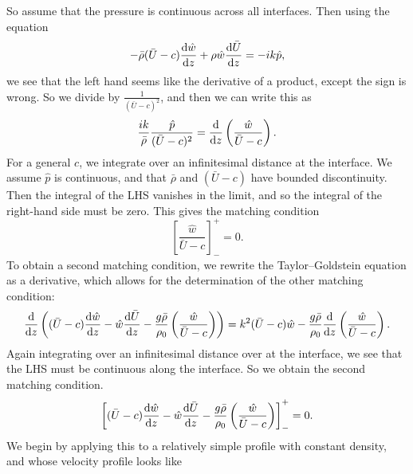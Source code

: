 \documentclass[a4paper]{article}
\begin{document}
So assume that the pressure is continuous across all interfaces. Then using the equation
\[
  - \bar{\rho} (\bar{U} - c) \frac{\mathrm{d} \hat{w}}{\mathrm{d} z} + \rho \hat{w} \frac{\mathrm{d} \bar{U}}{\mathrm{d} z} = -ik\hat{p},
\]
we see that the left hand seems like the derivative of a product, except the sign is wrong. So we divide by $\frac{1}{(\bar{U} - c)^2}$, and then we can write this as
\[
  \frac{ik}{\bar{\rho}} \frac{\hat{p}}{(\bar{U} - c)^2} = \frac{\mathrm{d}}{\mathrm{d} z}\left(\frac{\hat{w}}{\bar{U} - c}\right).
\]
For a general $c$, we integrate over an infinitesimal distance at the interface. We assume $\hat{p}$ is continuous, and that $\bar{\rho}$ and $(\bar{U} - c)$ have bounded discontinuity. Then the integral of the LHS vanishes in the limit, and so the integral of the right-hand side must be zero. This gives the matching condition
\[
  \left[ \frac{\hat{w}}{ \bar{U} - c}\right]^+_- = 0.
\]
To obtain a second matching condition, we rewrite the Taylor--Goldstein equation as a derivative, which allows for the determination of the other matching condition:
\[
  \frac{\mathrm{d}}{\mathrm{d} z} \left((\bar{U} - c) \frac{\mathrm{d} \hat{w}}{\mathrm{d} z} - \hat{w} \frac{\mathrm{d} \bar{U}}{\mathrm{d} z} - \frac{g \bar{\rho}}{\rho_0}\left(\frac{\hat{w}}{\bar{U} - c}\right)\right) = k^2 (\bar{U} - c)\hat{w} - \frac{g \bar{\rho}}{\rho_0} \frac{\mathrm{d}}{\mathrm{d} z} \left(\frac{\hat{w}}{\bar{U} - c}\right).
\]
Again integrating over an infinitesimal distance over at the interface, we see that the LHS must be continuous along the interface. So we obtain the second matching condition.
\[
  \left[(\bar{U} - c) \frac{\mathrm{d} \hat{w}}{\mathrm{d} z} - \hat{w} \frac{\mathrm{d} \bar{U}}{\mathrm{d} z} - \frac{g \bar{\rho}}{\rho_0}\left(\frac{\hat{w}}{\bar{U} - c}\right)\right]^+_- = 0.
\]
We begin by applying this to a relatively simple profile with constant density, and whose velocity profile looks like
\begin{center}
\end{center}
\end{document}
